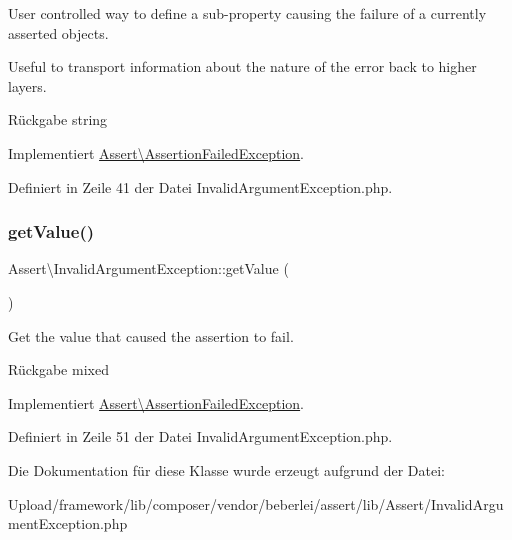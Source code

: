 User controlled way to define a sub-\/property causing the failure of a currently asserted objects.

Useful to transport information about the nature of the error back to higher layers.

\begin{DoxyReturn}{Rückgabe}
string 
\end{DoxyReturn}


Implementiert \mbox{\hyperlink{interface_assert_1_1_assertion_failed_exception}{Assert\textbackslash{}\+Assertion\+Failed\+Exception}}.



Definiert in Zeile 41 der Datei Invalid\+Argument\+Exception.\+php.

\mbox{\label{class_assert_1_1_invalid_argument_exception_ad987d6866cd903ac8217836ddded8a92}} 
\subsubsection{\texorpdfstring{get\+Value()}{getValue()}}
{\footnotesize\ttfamily Assert\textbackslash{}\+Invalid\+Argument\+Exception\+::get\+Value (\begin{DoxyParamCaption}{ }\end{DoxyParamCaption})}

Get the value that caused the assertion to fail.

\begin{DoxyReturn}{Rückgabe}
mixed 
\end{DoxyReturn}


Implementiert \mbox{\hyperlink{interface_assert_1_1_assertion_failed_exception}{Assert\textbackslash{}\+Assertion\+Failed\+Exception}}.



Definiert in Zeile 51 der Datei Invalid\+Argument\+Exception.\+php.



Die Dokumentation für diese Klasse wurde erzeugt aufgrund der Datei\+:\begin{DoxyCompactItemize}
\item 
Upload/framework/lib/composer/vendor/beberlei/assert/lib/\+Assert/Invalid\+Argument\+Exception.\+php\end{DoxyCompactItemize}
